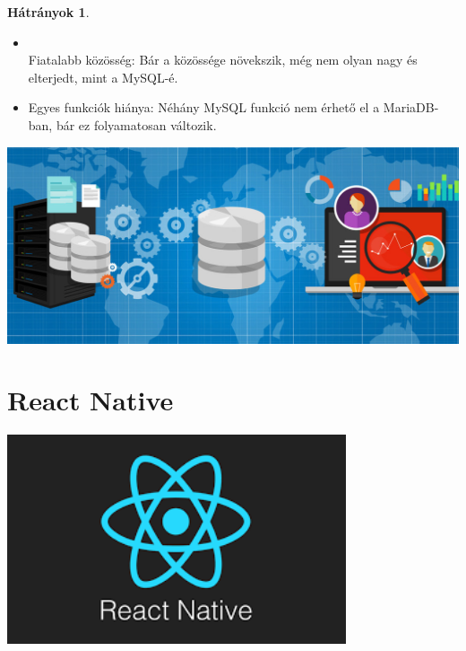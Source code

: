 \documentclass[colorlinks]{thesis-kando}
\theoremstyle{definition}
\newtheorem{hatranyok}{Hátrányok}
\theoremstyle{remark}
\begin{document}
    \begin{hatranyok}
    \begin{itemize}
        \item\mbox{} \\ Fiatalabb közösség: Bár a közössége növekszik, még nem olyan nagy és elterjedt, mint a MySQL-é.
        \item Egyes funkciók hiánya: Néhány MySQL funkció nem érhető el a MariaDB-ban, bár ez folyamatosan változik.
    \end{itemize}
    \end{hatranyok}

	\includegraphics[width=15cm]{figures/relacios.jpg}


 \section{React Native}

 \includegraphics[width=10cm]{figures/react.png}
\end{document}
